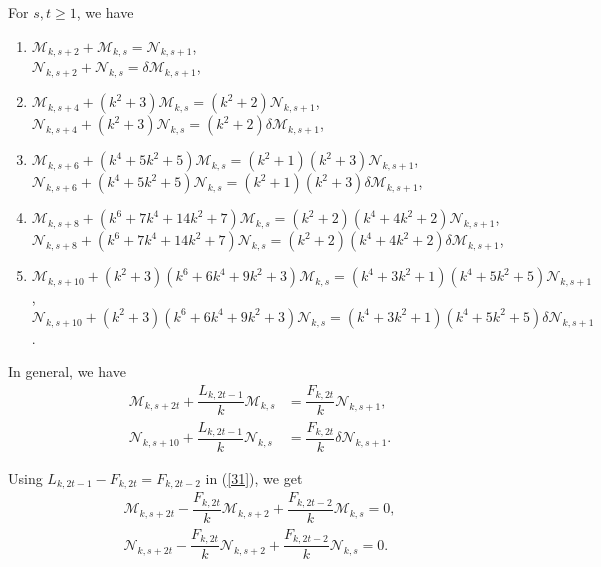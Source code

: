 \begin{theorem}For $s, t\geq 1$, we have\label{3.14}
\begin{enumerate}
\item $\mathcal{M}_{k,s+2}+\mathcal{M}_{k,s}=\mathcal{N}_{k,s+1}$,\\
$\mathcal{N}_{k,s+2}+\mathcal{N}_{k,s}=\delta\mathcal{M}_{k,s+1}$,
\item $\mathcal{M}_{k,s+4}+(k^2+3)\mathcal{M}_{k,s}=(k^2+2)\mathcal{N}_{k,s+1}$,\\
$\mathcal{N}_{k,s+4}+(k^2+3)\mathcal{N}_{k,s}=(k^2+2)\delta\mathcal{M}_{k,s+1}$,
\item $\mathcal{M}_{k,s+6}+(k^4+5k^2+5)\mathcal{M}_{k,s}=(k^2+1)(k^2+3)\mathcal{N}_{k,s+1}$,\\
$\mathcal{N}_{k,s+6}+(k^4+5k^2+5)\mathcal{N}_{k,s}=(k^2+1)(k^2+3)\delta\mathcal{M}_{k,s+1}$,
\item $\mathcal{M}_{k,s+8}+(k^6+7k^4+14k^2+7)\mathcal{M}_{k,s}=(k^2+2)(k^4+4k^2+2)\mathcal{N}_{k,s+1}$,\\
$\mathcal{N}_{k,s+8}+(k^6+7k^4+14k^2+7)\mathcal{N}_{k,s}=(k^2+2)(k^4+4k^2+2)\delta\mathcal{M}_{k,s+1}$,
\item $\mathcal{M}_{k,s+10}+(k^2+3)(k^6+6k^4+9k^2+3)\mathcal{M}_{k,s}=(k^4+3k^2+1)(k^4+5k^2+5)\mathcal{N}_{k,s+1}$,\\
$\mathcal{N}_{k,s+10}+(k^2+3)(k^6+6k^4+9k^2+3)\mathcal{N}_{k,s}=(k^4+3k^2+1)(k^4+5k^2+5)\delta\mathcal{N}_{k,s+1}$.
\end{enumerate}
In general, we have
\begin{align}\label{31}
\mathcal{M}_{k,s+2t}+\dfrac{L_{k,2t-1}}{k}\mathcal{M}_{k,s}&=\dfrac{F_{k,2t}}{k}\mathcal{N}_{k,s+1},\\
\mathcal{N}_{k,s+10}+\dfrac{L_{k,2t-1}}{k}\mathcal{N}_{k,s}&=\dfrac{F_{k,2t}}{k}\delta\mathcal{N}_{k,s+1}.
\end{align}
\end{theorem}
\begin{remark}
Using $L_{k,2t-1}-F_{k,2t}=F_{k,2t-2}$ in (\ref{31}), we get
\begin{align*}
\mathcal{M}_{k,s+2t}-\dfrac{F_{k,2t}}{k}\mathcal{M}_{k,s+2}+\dfrac{F_{k,2t-2}}{k}\mathcal{M}_{k,s}=0,\\
\mathcal{N}_{k,s+2t}-\dfrac{F_{k,2t}}{k}\mathcal{N}_{k,s+2}+\dfrac{F_{k,2t-2}}{k}\mathcal{N}_{k,s}=0.
\end{align*}
\end{remark}
